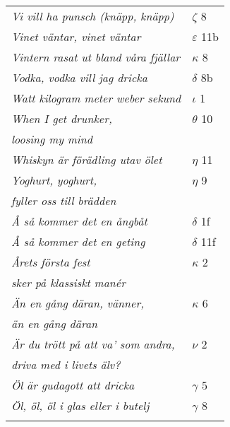 \documentclass[a6paper,10pt]{article}
\begin{document}
\newpage
\setlength{\oddsidemargin}{-0.37in}
\begin{table}[!]
\begin{tabular}{l l}
\textit{Vi vill ha punsch (knäpp, knäpp)}	&$\zeta$ 8\\
\textit{Vinet väntar, vinet väntar}	&$\varepsilon$ 11b\\
\textit{Vintern rasat ut bland våra fjällar}	&$\kappa$ 8\\
\textit{Vodka, vodka vill jag dricka}	&$\delta$ 8b\\
\textit{Watt kilogram meter weber sekund}	&$\iota$ 1\\
\textit{When I get drunker,}	&$\theta$ 10\\
\textit{loosing my mind} &\\
\textit{Whiskyn är förädling utav ölet}	&$\eta$ 11\\
\textit{Yoghurt, yoghurt,}	&$\eta$ 9\\
\textit{fyller oss till brädden} &\\
\textit{Å så kommer det en ångbåt}	&$\delta$ 1f\\
\textit{Å så kommer det en geting}	&$\delta$ 11f\\
\textit{Årets första fest}	&$\kappa$ 2\\
\textit{sker på klassiskt manér} &\\
\textit{Än en gång däran, vänner,}	&$\kappa$ 6\\
\textit{än en gång däran} &\\
\textit{Är du trött på att va' som andra,}	&$\nu$ 2\\
\textit{driva med i livets älv?} &\\
\textit{Öl är gudagott att dricka}	&$\gamma$ 5\\
\textit{Öl, öl, öl i glas eller i butelj}	&$\gamma$ 8\\ 
\vspace{150pt}
\end{tabular}
\end{table}
\end{document}
